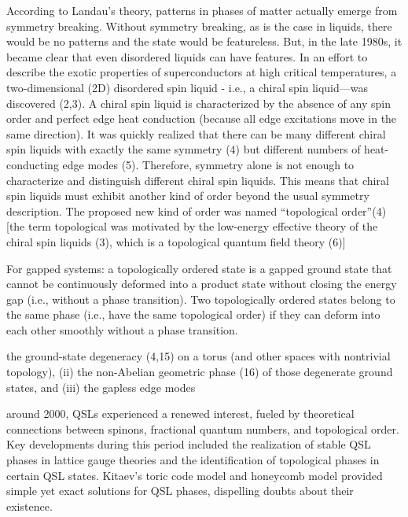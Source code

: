 

According to  Landau's theory, patterns in phases of matter actually emerge from symmetry breaking. Without symmetry breaking, as is the case in liquids, there would be no patterns and the state would be featureless. But, in the late 1980s, it became clear that even disordered liquids can have features. In an effort to describe the exotic properties of superconductors at high critical temperatures, a two-dimensional (2D) disordered spin liquid - i.e., a chiral spin liquid—was discovered (2,3). A chiral spin liquid is characterized by the absence of any spin order and perfect edge heat conduction (because all edge excitations move in the same direction). It was quickly realized that there can be many different chiral spin liquids with exactly the same symmetry (4) but different numbers of heat-conducting edge modes (5). Therefore, symmetry alone is not enough to characterize and distinguish different chiral spin liquids. This means that chiral spin liquids must exhibit another kind of order beyond the usual symmetry description. The proposed new kind of order was named ``topological order''(4) [the term topological was motivated by the low-energy effective theory of the chiral spin liquids (3), which is a topological quantum field theory (6)]

For gapped systems: a topologically ordered state is a gapped ground state that cannot be continuously deformed into a product state without closing the energy gap (i.e., without a phase transition). Two topologically ordered states belong to the same phase (i.e., have the same topological order) if they can deform into each other smoothly without a phase transition.

the ground-state degeneracy (4,15) on a torus (and other spaces with nontrivial topology), (ii) the non-Abelian geometric  phase  (16)  of  those  degenerate ground states, and (iii) the gapless edge modes


around 2000, QSLs experienced a renewed interest, fueled by theoretical connections between spinons, fractional quantum numbers, and topological order.
Key developments during this period included the realization of stable QSL phases in lattice gauge theories and the identification of topological phases in certain QSL states. Kitaev's toric code model and honeycomb model provided simple yet exact solutions for QSL phases, dispelling doubts about their existence.

